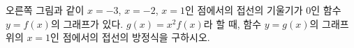 \noindent\begin{minipage}[t]{0.58\linewidth}\vspace{0pt}\raggedright 오른쪽 그림과 같이 $x=-3$, $x=-2$, $x=1$인 점에서의 접선의 기울기가 $0$인 함수 $y=f(x)$의 그래프가 있다. $g(x)=x^2f(x)$라 할 때, 함수 $y=g(x)$의 그래프 위의 $x=1$인 점에서의 접선의 방정식을 구하시오.\end{minipage}\hfill\begin{minipage}[t]{0.4\linewidth}\vspace{0pt}\centering \resizebox{\ifdim\width>\linewidth\linewidth\else\width\fi}{!}{}\end{minipage}\par
